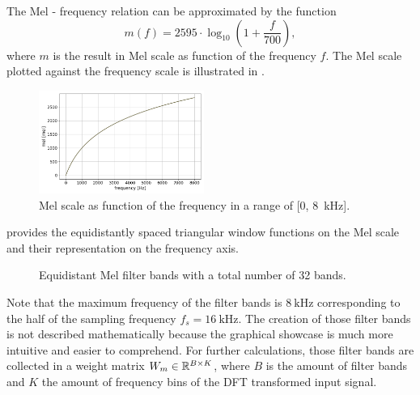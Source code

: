 The Mel - frequency relation can be approximated by the function
\begin{equation}\label{eq:signal_mfcc_mel}
  m(f) = 2595 \cdot \log_{10} \left(1 + \frac{f}{700} \right),
\end{equation}
where $m$ is the result in Mel scale as function of the frequency $f$.
The Mel scale plotted against the frequency scale is illustrated in .
\begin{figure}[!ht]
  \centering
  \includegraphics[width=0.48\textwidth]{./3_signal/figs/signal_mfcc_mel_scale.png}
  \caption{Mel scale as function of the frequency in a range of [0, \SI{8}{\kilo\hertz}].}
  \label{fig:signal_mfcc_mel_scale}
\end{figure}
\FloatBarrier
\noindent
{} provides the equidistantly spaced triangular window functions on the Mel scale and their representation on the frequency axis.
\begin{figure}[!ht]
  \centering
  \quad
  \caption{Equidistant Mel filter bands with a total number of 32 bands.}
  \label{fig:filter_bands}
\end{figure}
\FloatBarrier
\noindent
Note that the maximum frequency of the filter bands is $\SI{8}{\kilo\hertz}$ corresponding to the half of the sampling frequency $f_s = \SI{16}{\kilo\hertz}$.
The creation of those filter bands is not described mathematically because the graphical showcase is much more intuitive and easier to comprehend.
For further calculations, those filter bands are collected in a weight matrix $W_m \in \mathbb{R}^{B \times K}$, where $B$ is the amount of filter bands and $K$ the amount of frequency bins of the DFT transformed input signal.

